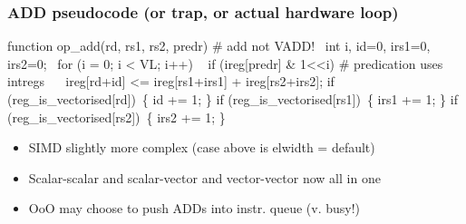 \documentclass[slidestop]{beamer}
\begin{document}


\begin{frame}[fragile]
\frametitle{ADD pseudocode (or trap, or actual hardware loop)}

\begin{semiverbatim}
function op_add(rd, rs1, rs2, predr) # add not VADD!
  int i, id=0, irs1=0, irs2=0;
  for (i = 0; i < VL; i++)
    if (ireg[predr] & 1<<i) # predication uses intregs
       ireg[rd+id] <= ireg[rs1+irs1] + ireg[rs2+irs2];
    if (reg_is_vectorised[rd]) \{ id += 1; \}
    if (reg_is_vectorised[rs1]) \{ irs1 += 1; \}
    if (reg_is_vectorised[rs2]) \{ irs2 += 1; \}
\end{semiverbatim}

  \begin{itemize}
   \item SIMD slightly more complex (case above is elwidth = default)
   \item Scalar-scalar and scalar-vector and vector-vector now all in one
   \item OoO may choose to push ADDs into instr. queue (v. busy!)
  \end{itemize}
\end{frame}
\end{document}
